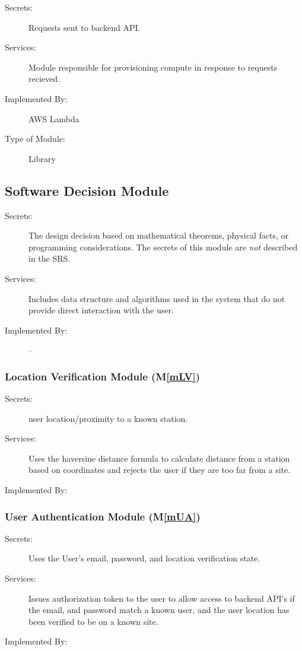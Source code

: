 \documentclass[12pt, titlepage]{article}
\newcommand{\mref}[1]{M\ref{#1}}
\begin{document}
\begin{description}
  \item[Secrets:] Requests sent to backend API.
  \item[Services:] Module responsible for provisioning compute in
    response to requests recieved.
  \item[Implemented By:] AWS Lambda
  \item[Type of Module:] Library
\end{description}

\subsection{Software Decision Module}

\begin{description}
  \item[Secrets:] The design decision based on mathematical theorems, physical
    facts, or programming considerations. The secrets of this module are
    \emph{not} described in the SRS.
  \item[Services:] Includes data structure and algorithms used in the
    system that
    do not provide direct interaction with the user.
  \item[Implemented By:] --
\end{description}

\subsubsection{Location Verification Module (\mref{mLV})}
\begin{description}
  \item[Secrets:] user location/proximity to a known station.
  \item[Services:] Uses the haversine distance formula to calculate
    distance from a station based on coordinates and rejects the user
    if they are too far from a site.
  \item[Implemented By:] \progname
\end{description}

\subsubsection{User Authentication Module (\mref{mUA})}

\begin{description}
  \item[Secrets:] Uses the User's email, password, and location
    verification state.
  \item[Services:] Issues authorization token to the user to allow
    access to backend API's if the email, and password match a known
    user, and the user location has been verified to be on a known site.
  \item[Implemented By:] \progname
\end{description}
\end{document}
